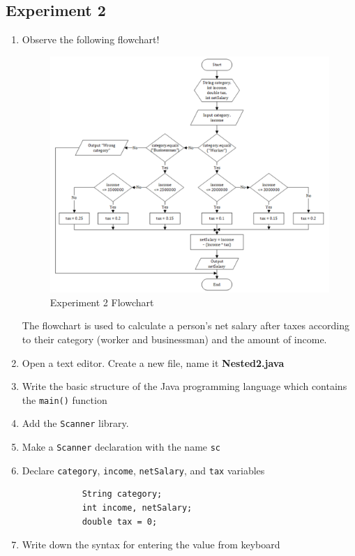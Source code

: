 \documentclass[12pt,titlepage]{article}
\begin{document}
\subsection{Experiment 2}
\begin{enumerate}
    \item {
        Observe the following flowchart!
        
        \begin{figure}[h]
            \centering
            \includegraphics[width=\textwidth]{images/experiment2-flowchart.png}
            \caption{Experiment 2 Flowchart}
        \end{figure}

        The flowchart is used to calculate a person's net salary after taxes according to their
        category (worker and businessman) and the amount of income.
    }
    \item Open a text editor. Create a new file, name it \textbf{Nested2.java}
    \item Write the basic structure of the Java programming language which contains the \texttt{main()} function
    \item Add the \texttt{Scanner} library.
    \item Make a \texttt{Scanner} declaration with the name \texttt{sc}
    \pagebreak
    \item {
        Declare \texttt{category}, \texttt{income}, \texttt{netSalary}, and \texttt{tax} variables

        \begin{verbatim}
            String category;
            int income, netSalary;
            double tax = 0;
        \end{verbatim}
    }
    \item {
        Write down the syntax for entering the value from keyboard

}
\end{enumerate}
\end{document}
